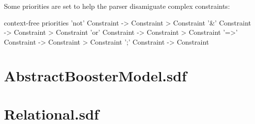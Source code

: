 Some priorities are set to help the parser disamiguate complex constraints:

\begin{code}
context-free priorities
  'not' Constraint		-> Constraint 
  > Constraint '&' Constraint 	-> Constraint 
  > Constraint 'or' Constraint 	-> Constraint
  > Constraint '=>' Constraint 	-> Constraint 
  > Constraint ';' Constraint 	-> Constraint 
\end{code}


\section{AbstractBoosterModel.sdf}
\section{Relational.sdf}
